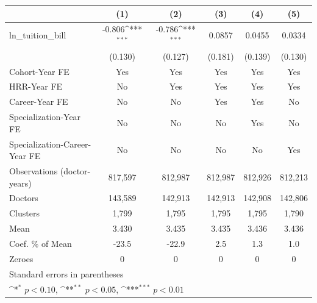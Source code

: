 {
\def\sym#1{\ifmmode^{#1}\else\(^{#1}\)\fi}
\begin{tabular}{l*{5}{c}}
\hline\hline
                    &\multicolumn{1}{c}{(1)}         &\multicolumn{1}{c}{(2)}         &\multicolumn{1}{c}{(3)}         &\multicolumn{1}{c}{(4)}         &\multicolumn{1}{c}{(5)}         \\
\hline
ln\_tuition\_bill     &      -0.806\sym{***}&      -0.786\sym{***}&      0.0857         &      0.0455         &      0.0334         \\
                    &     (0.130)         &     (0.127)         &     (0.181)         &     (0.139)         &     (0.130)         \\
[1em]
Cohort-Year FE      &         Yes         &         Yes         &         Yes         &         Yes         &         Yes         \\
[1em]
HRR-Year FE         &          No         &         Yes         &         Yes         &         Yes         &         Yes         \\
[1em]
Career-Year FE      &          No         &          No         &         Yes         &         Yes         &          No         \\
[1em]
Specialization-Year FE&          No         &          No         &          No         &         Yes         &          No         \\
[1em]
Specialization-Career-Year FE&          No         &          No         &          No         &          No         &         Yes         \\
\hline
Observations (doctor-years)&     817,597         &     812,987         &     812,987         &     812,926         &     812,213         \\
Doctors             &     143,589         &     142,913         &     142,913         &     142,908         &     142,806         \\
Clusters            &       1,799         &       1,795         &       1,795         &       1,795         &       1,790         \\
Mean                &       3.430         &       3.435         &       3.435         &       3.436         &       3.436         \\
Coef. \% of Mean    &       -23.5         &       -22.9         &         2.5         &         1.3         &         1.0         \\
Zeroes              &           0         &           0         &           0         &           0         &           0         \\
\hline\hline
\multicolumn{6}{l}{\footnotesize Standard errors in parentheses}\\
\multicolumn{6}{l}{\footnotesize \sym{*} \(p<0.10\), \sym{**} \(p<0.05\), \sym{***} \(p<0.01\)}\\
\end{tabular}
}
